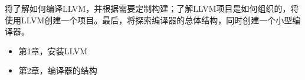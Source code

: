 
将了解如何编译LLVM，并根据需要定制构建；了解LLVM项目是如何组织的，将使用LLVM创建一个项目。最后，将探索编译器的总体结构，同时创建一个小型编译器。

\begin{itemize}
\item
第1章，安装LLVM

\item
第2章，编译器的结构
\end{itemize}
